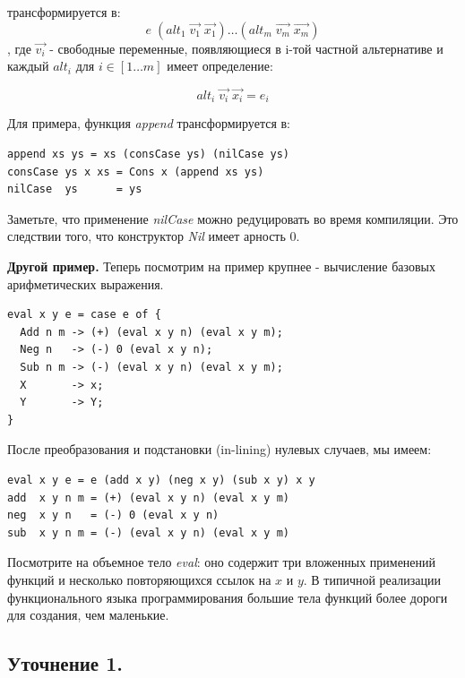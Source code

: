 \documentclass[14pt]{extarticle}
\begin{document}
трансформируется в:
$$
e \; (alt_1 \;  \overrightarrow{v_1} \; \overrightarrow{x_1} ) \ldots (alt_m \;  \overrightarrow{v_m} \; \overrightarrow{x_m} )
$$
, где $\overrightarrow{v_i}$ - свободные переменные, появляющиеся в i-той частной альтернативе и каждый $alt_i$ для $i \in [1 \ldots m]$ имеет определение:

$$
	alt_i \; \overrightarrow{v_i} \; \overrightarrow{x_i} = e_i
$$

Для примера, функция \textit{append} трансформируется в:
\begin{verbatim}
append xs ys = xs (consCase ys) (nilCase ys)
consCase ys x xs = Cons x (append xs ys)
nilCase  ys      = ys
\end{verbatim}

Заметьте, что применение \textit{nilCase} можно редуцировать во время компиляции. Это следствии того, что конструктор \textit{Nil} имеет арность 0.

\textbf{Другой пример.} Теперь посмотрим на пример крупнее - вычисление базовых арифметических выражения.
\begin{verbatim}
eval x y e = case e of {
  Add n m -> (+) (eval x y n) (eval x y m);
  Neg n   -> (-) 0 (eval x y n);
  Sub n m -> (-) (eval x y n) (eval x y m);
  X       -> x;
  Y       -> Y;
}
\end{verbatim}

После преобразования и подстановки (in-lining) нулевых случаев, мы имеем:
\begin{verbatim}
eval x y e = e (add x y) (neg x y) (sub x y) x y
add  x y n m = (+) (eval x y n) (eval x y m)
neg  x y n   = (-) 0 (eval x y n)
sub  x y n m = (-) (eval x y n) (eval x y m)
\end{verbatim}

Посмотрите на объемное тело \textit{eval}: оно содержит три вложенных применений функций и несколько повторяющихся ссылок на $x$ и $y$. В типичной реализации функционального языка программирования большие тела функций более дороги для создания, чем маленькие.

\subsection{Уточнение 1.} 
\end{document}
